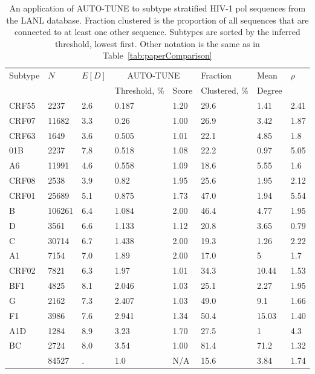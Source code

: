 \documentclass[utf8]{FrontiersinHarvard} %
\begin{document}
\begin{table}[h]
	\caption{An application of AUTO-TUNE to subtype stratified HIV-1 pol sequences from the LANL database. Fraction clustered is the proportion of all sequences that are connected to at least one other sequence. Subtypes are sorted by the inferred threshold, lowest first. Other notation is the same as in Table~\ref{tab:paperComparison}}
	
	\vspace{10pt}
	\centering
	\begin{small}
	\label{tab:paperLANL}
	\begin{tabular}{llllllll}
	   \hline
		Subtype  &  $N$ & $E[D]$ & \multicolumn{2}{c}{AUTO-TUNE} & Fraction & Mean &  $\rho$ \\
		     &  & & Threshold, \% & Score & Clustered, \% & Degree & \\
		    \hline
		     
		 CRF55 & 2237 & 2.6 & 0.187 & 1.20 & 29.6 & 1.41 & 2.41 \\
		 CRF07 & 11682 &  3.3 & 0.26 & 1.00& 26.9 & 3.42 & 1.87 \\
		 CRF63 & 1649 & 3.6 & 0.505 & 1.01 & 22.1 & 4.85 &  1.8 \\
		 01B	 & 2237 & 7.8 & 0.518 & 1.08 & 22.2 & 0.97 & 5.05 \\
		 A6 & 11991 & 4.6 & 0.558 &  1.09 & 18.6 & 5.55 & 1.6 \\
		CRF08 & 2538 &  3.9 & 0.82 & 1.95& 25.6 & 1.95 & 2.12 \\
		 CRF01 & 25689 & 5.1 & 0.875 & 1.73 & 47.0 & 1.94 & 5.54 \\
	 	B & 106261 & 6.4 & 1.084 & 2.00 & 46.4 & 4.77 & 1.95 \\
		 D & 3561 & 6.6 & 1.133 & 1.12 & 20.8 & 3.65 & 0.79 \\
		 C & 30714 & 6.7 & 1.438 & 2.00 & 19.3 & 1.26 & 2.22 \\
		 A1 & 7154 & 7.0 & 1.89 & 2.00 & 17.0 & 5 & 1.7 \\
		 CRF02 & 7821 &  6.3 & 1.97 & 1.01 & 34.3 & 10.44 & 1.53 \\
		 BF1 & 4825 & 8.1 & 2.046 & 1.03 & 25.1 & 2.27 & 1.95 \\
		 G & 2162 & 7.3 & 2.407 & 1.03 & 49.0 & 9.1 & 1.66\\
		 F1 & 3986 & 7.6 & 2.941 & 1.34 & 50.4 & 15.03 & 1.40 \\
		 A1D & 1284 & 8.9 & 3.23 & 1.70 & 27.5 & 1 & 4.3 \\
		 BC & 2724 & 8.0 & 3.54 & 1.00 & 81.4 & 71.2 & 1.32 \\ 
		 \hline
		 \citet{Wertheim:2014aa}  & 84527 & . & 1.0 & N/A & 15.6 & 3.84 & 1.74 \\
 		\hline
		
		\hline
	\end{tabular}
	\end{small}
\end{table}
\end{document}
